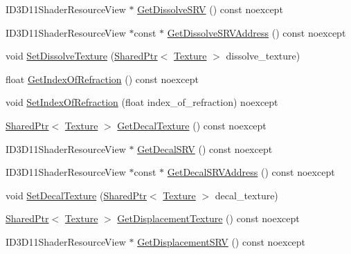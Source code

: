 \begin{DoxyCompactItemize}
\item 
I\+D3\+D11\+Shader\+Resource\+View $\ast$ \hyperlink{structmage_1_1_shaded_material_ac74d2e8849300aa1e54cbce0bf8cbeff}{Get\+Dissolve\+S\+RV} () const noexcept
\item 
I\+D3\+D11\+Shader\+Resource\+View $\ast$const  $\ast$ \hyperlink{structmage_1_1_shaded_material_aa114be8c5d55096554cf75fdba75ab2d}{Get\+Dissolve\+S\+R\+V\+Address} () const noexcept
\item 
void \hyperlink{structmage_1_1_shaded_material_ab7f2f36caddb8bbdde8753424968c231}{Set\+Dissolve\+Texture} (\hyperlink{namespacemage_a1e01ae66713838a7a67d30e44c67703e}{Shared\+Ptr}$<$ \hyperlink{classmage_1_1_texture}{Texture} $>$ dissolve\+\_\+texture)
\item 
float \hyperlink{structmage_1_1_shaded_material_a4078cfbed3a919214428ab01d991b589}{Get\+Index\+Of\+Refraction} () const noexcept
\item 
void \hyperlink{structmage_1_1_shaded_material_af287d28549dc682fe4f067a6e30b71a8}{Set\+Index\+Of\+Refraction} (float index\+\_\+of\+\_\+refraction) noexcept
\item 
\hyperlink{namespacemage_a1e01ae66713838a7a67d30e44c67703e}{Shared\+Ptr}$<$ \hyperlink{classmage_1_1_texture}{Texture} $>$ \hyperlink{structmage_1_1_shaded_material_affd31417050c3fa426791fa521c03fc9}{Get\+Decal\+Texture} () const noexcept
\item 
I\+D3\+D11\+Shader\+Resource\+View $\ast$ \hyperlink{structmage_1_1_shaded_material_ad16addcaa9b32b7a9d5ce793d55b1b2c}{Get\+Decal\+S\+RV} () const noexcept
\item 
I\+D3\+D11\+Shader\+Resource\+View $\ast$const  $\ast$ \hyperlink{structmage_1_1_shaded_material_ac6bd86176058b7fdeb4c9a7823ff8c71}{Get\+Decal\+S\+R\+V\+Address} () const noexcept
\item 
void \hyperlink{structmage_1_1_shaded_material_a4acb72c80dfc51dacb5cba6621234685}{Set\+Decal\+Texture} (\hyperlink{namespacemage_a1e01ae66713838a7a67d30e44c67703e}{Shared\+Ptr}$<$ \hyperlink{classmage_1_1_texture}{Texture} $>$ decal\+\_\+texture)
\item 
\hyperlink{namespacemage_a1e01ae66713838a7a67d30e44c67703e}{Shared\+Ptr}$<$ \hyperlink{classmage_1_1_texture}{Texture} $>$ \hyperlink{structmage_1_1_shaded_material_acf3273d75933ca238075150dd7cc7dca}{Get\+Displacement\+Texture} () const noexcept
\item 
I\+D3\+D11\+Shader\+Resource\+View $\ast$ \hyperlink{structmage_1_1_shaded_material_ac33beb240df46ad6295425851cafc996}{Get\+Displacement\+S\+RV} () const noexcept

\end{DoxyCompactItemize}
